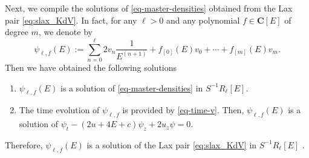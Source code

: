 \documentclass[a4paper,12pt]{article}
\newcommand{\coC}{\mathbf{C}}
\begin{document}
 Next, we compile the solutions of \eqref{eq-master-densities} obtained from the Lax pair \eqref{eq:slax_KdV}. In fact, for any $\ell >0$ and any polynomial $f\in \coC[E]$ of degree $m$, we denote by 
\begin{equation}
    \psi_{\ell, f}(E) := \sum_{n=0}^\ell 2v_n \frac{1}{E^{(n+1)}}+f_{[0]}(E) v_0 +\cdots + f_{[m]}(E) v_m .
\end{equation}
Then we have obtained the following solutions
\begin{enumerate}[label=(\alph*)]
    \item $ \psi_{\ell, f}(E)$ is a solution of \eqref{eq-master-densities} in $S^{-1} R_\ell [E]$.
    \item The time evolution of $\psi_{\ell, f} $ is provided by \eqref{eq-time-v}. Then, $ \psi_{\ell, f}(E)$ is a solution of \(\psi_t-(2u+4E+c)\psi_z + 2u_z\psi =0\).
\end{enumerate}
Therefore, $\psi_{\ell, f}(E)$ is a solution of the Lax pair \eqref{eq:slax_KdV} in $S^{-1} R_\ell [E]$ .
\end{document}
